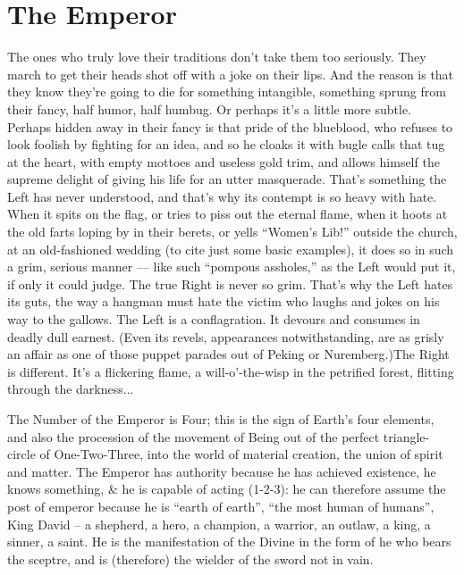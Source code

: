 \section{The Emperor}

\begin{quotex}
The ones who truly love their traditions don't take them too seriously. They march to get their heads shot off with a joke on their lips. And the reason is that they know they're going to die for something intangible, something sprung from their fancy, half humor, half humbug. Or perhaps it's a little more subtle. Perhaps hidden away in their fancy is that pride of the blueblood, who refuses to look foolish by fighting for an idea, and so he cloaks it with bugle calls that tug at the heart, with empty mottoes and useless gold trim, and allows himself the supreme delight of giving his life for an utter masquerade. That's something the Left has never understood, and that's why its contempt is so heavy with hate. When it spits on the flag, or tries to piss out the eternal flame, when it hoots at the old farts loping by in their berets, or yells ``Women's Lib!'' outside the church, at an old-fashioned wedding (to cite just some basic examples), it does so in such a grim, serious manner --- like such ``pompous assholes,'' as the Left would put it, if only it could judge. The true Right is never so grim. That's why the Left hates its guts, the way a hangman must hate the victim who laughs and jokes on his way to the gallows. The Left is a conflagration. It devours and consumes in deadly dull earnest. (Even its revels, appearances notwithstanding, are as grisly an affair as one of those puppet parades out of Peking or Nuremberg.)The Right is different. It's a flickering flame, a will-o'-the-wisp in the petrified forest, flitting through the darkness...

\end{quotex}


The Number of the Emperor is Four; this is the sign of Earth's four elements, and also the procession of the movement of Being out of the perfect triangle-circle of One-Two-Three, into the world of material creation, the union of spirit and matter. The Emperor has authority because he has achieved existence, he knows something, \& he is capable of acting (1-2-3): he can therefore assume the post of emperor because he is ``earth of earth'', ``the most human of humans'', King David -- a shepherd, a hero, a champion, a warrior, an outlaw, a king, a sinner, a saint. He is the manifestation of the Divine in the form of he who bears the sceptre, and is (therefore) the wielder of the sword not in vain.

